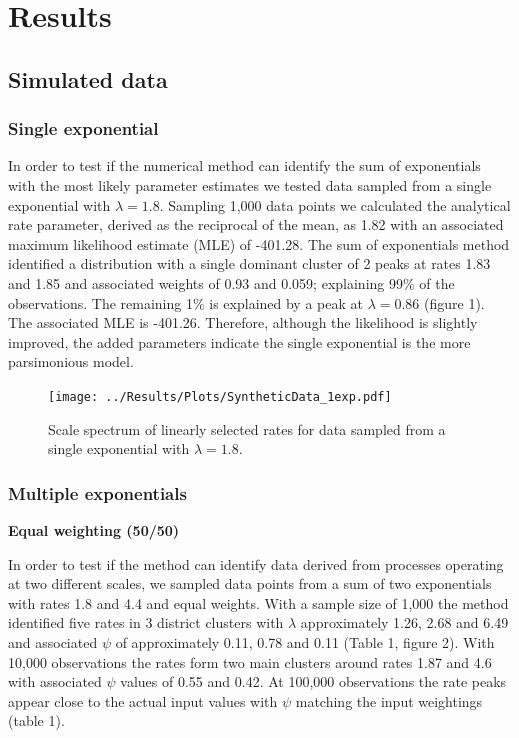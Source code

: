 \documentclass[11pt,usenames,dvipsnames,a4paper]{article}
\begin{document}
\section{Results}

\noindent
\subsection{Simulated data}

\subsubsection{Single exponential}

\begin{linenumbers}
\hspace{\parindent}
In order to test if the numerical method can identify the sum of exponentials with the most likely parameter estimates we tested data sampled from a single exponential with $\lambda = 1.8$. Sampling 1,000 data points we calculated the analytical rate parameter, derived as the reciprocal of the mean, as 1.82 with an associated maximum likelihood estimate (MLE) of -401.28. The sum of exponentials method identified a distribution with a single dominant cluster of 2 peaks at rates 1.83 and 1.85 and associated weights of 0.93 and 0.059; explaining 99\% of the observations. The remaining 1\% is explained by a peak at $\lambda = 0.86$ (figure 1). The associated MLE is -401.26. Therefore, although the likelihood is slightly improved, the added parameters indicate the single exponential is the more parsimonious model.
\end{linenumbers}
\begin{figure}[H]
	\centering
	\texttt{[image: ../Results/Plots/SyntheticData\_1exp.pdf]}
	\caption{Scale spectrum of linearly selected rates for data sampled from a single exponential with $\lambda = 1.8$.}
\end{figure}


\subsubsection{Multiple exponentials}

\noindent
\textbf{Equal weighting (50/50)}
\begin{linenumbers}
	
In order to test if the method can identify data derived from processes operating at two different scales, we sampled data points from a sum of two exponentials with rates 1.8 and 4.4 and equal weights. With a sample size of 1,000 the method identified five rates in 3 district clusters with $\lambda$ approximately 1.26, 2.68 and 6.49 and associated $\psi$ of approximately 0.11, 0.78 and 0.11 (Table 1, figure 2). With 10,000 observations the rates form two main clusters around rates 1.87 and 4.6 with associated $\psi$ values of 0.55 and 0.42. At 100,000 observations the rate peaks appear close to the actual input values with $\psi$ matching the input weightings (table 1).
\end{linenumbers}
\end{document}
